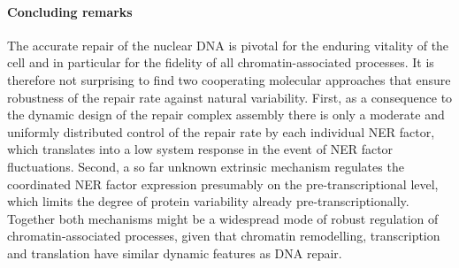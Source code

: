 %
%
%
%

\paragraph{Concluding remarks}
The accurate repair of the nuclear DNA is pivotal for the enduring vitality of the cell and in particular for the fidelity of all chromatin-associated processes. It is therefore not surprising to find two cooperating molecular approaches that ensure robustness of the repair rate against natural variability. First, as a consequence to the dynamic design of the repair complex assembly there is only a moderate and uniformly distributed control of the repair rate by each individual NER factor, which translates into a low system response in the event of NER factor fluctuations. Second, a so far unknown extrinsic mechanism regulates the coordinated NER factor expression presumably on the pre-transcriptional level, which limits the degree of protein variability already pre-transcriptionally. Together both mechanisms might be a widespread mode of robust regulation of chromatin-associated processes, given that chromatin remodelling, transcription and translation have similar dynamic features as DNA repair.